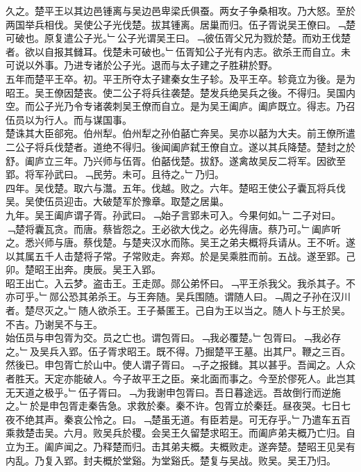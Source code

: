 \documentclass{zhvt-classic}
\begin{document}
\hspace*{2em}久之。楚平王以其边邑锺离与吴边邑卑梁氏俱蚕。两女子争桑相攻。乃大怒。至於两国举兵相伐。吴使公子光伐楚。拔其锺离。居巢而归。伍子胥说吴王僚曰。﹁楚可破也。原复遣公子光。﹂公子光谓吴王曰。﹁彼伍胥父兄为戮於楚。而劝王伐楚者。欲以自报其雠耳。伐楚未可破也。﹂伍胥知公子光有内志。欲杀王而自立。未可说以外事。乃进专诸於公子光。退而与太子建之子胜耕於野。\\
\hspace*{2em}五年而楚平王卒。初。平王所夺太子建秦女生子轸。及平王卒。轸竟立为後。是为昭王。吴王僚因楚丧。使二公子将兵往袭楚。楚发兵绝吴兵之後。不得归。吴国内空。而公子光乃令专诸袭刺吴王僚而自立。是为吴王阖庐。阖庐既立。得志。乃召伍员以为行人。而与谋国事。\\
\hspace*{2em}楚诛其大臣郤宛。伯州犁。伯州犁之孙伯嚭亡奔吴。吴亦以嚭为大夫。前王僚所遣二公子将兵伐楚者。道绝不得归。後闻阖庐弑王僚自立。遂以其兵降楚。楚封之於舒。阖庐立三年。乃兴师与伍胥。伯嚭伐楚。拔舒。遂禽故吴反二将军。因欲至郢。将军孙武曰。﹁民劳。未可。且待之。﹂乃归。\\
\hspace*{2em}四年。吴伐楚。取六与灊。五年。伐越。败之。六年。楚昭王使公子囊瓦将兵伐吴。吴使伍员迎击。大破楚军於豫章。取楚之居巢。\\
\hspace*{2em}九年。吴王阖庐谓子胥。孙武曰。﹁始子言郢未可入。今果何如。﹂二子对曰。﹁楚将囊瓦贪。而唐。蔡皆怨之。王必欲大伐之。必先得唐。蔡乃可。﹂阖庐听之。悉兴师与唐。蔡伐楚。与楚夹汉水而陈。吴王之弟夫概将兵请从。王不听。遂以其属五千人击楚将子常。子常败走。奔郑。於是吴乘胜而前。五战。遂至郢。己卯。楚昭王出奔。庚辰。吴王入郢。\\
\hspace*{2em}昭王出亡。入云梦。盗击王。王走郧。郧公弟怀曰。﹁平王杀我父。我杀其子。不亦可乎。﹂郧公恐其弟杀王。与王奔随。吴兵围随。谓随人曰。﹁周之子孙在汉川者。楚尽灭之。﹂随人欲杀王。王子綦匿王。己自为王以当之。随人卜与王於吴。不吉。乃谢吴不与王。\\
\hspace*{2em}始伍员与申包胥为交。员之亡也。谓包胥曰。﹁我必覆楚。﹂包胥曰。﹁我必存之。﹂及吴兵入郢。伍子胥求昭王。既不得。乃掘楚平王墓。出其尸。鞭之三百。然後已。申包胥亡於山中。使人谓子胥曰。﹁子之报雠。其以甚乎。吾闻之。人众者胜天。天定亦能破人。今子故平王之臣。亲北面而事之。今至於僇死人。此岂其无天道之极乎。﹂伍子胥曰。﹁为我谢申包胥曰。吾日暮途远。吾故倒行而逆施之。﹂於是申包胥走秦告急。求救於秦。秦不许。包胥立於秦廷。昼夜哭。七日七夜不绝其声。秦哀公怜之。曰。﹁楚虽无道。有臣若是。可无存乎。﹂乃遣车五百乘救楚击吴。六月。败吴兵於稷。会吴王久留楚求昭王。而阖庐弟夫概乃亡归。自立为王。阖庐闻之。乃释楚而归。击其弟夫概。夫概败走。遂奔楚。楚昭王见吴有内乱。乃复入郢。封夫概於堂谿。为堂谿氏。楚复与吴战。败吴。吴王乃归。\\
\end{document}
